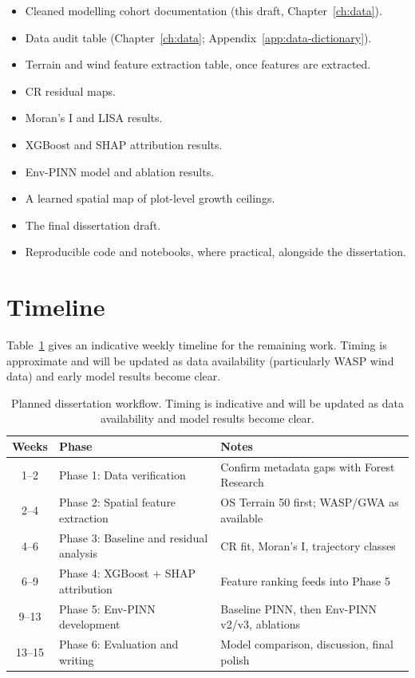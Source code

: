 \begin{itemize}
  \item Cleaned modelling cohort documentation (this draft, Chapter~\ref{ch:data}).
  \item Data audit table (Chapter~\ref{ch:data}; Appendix~\ref{app:data-dictionary}).
  \item Terrain and wind feature extraction table, once features are extracted.
  \item CR residual maps.
  \item Moran's I and LISA results.
  \item XGBoost and SHAP attribution results.
  \item Env-PINN model and ablation results.
  \item A learned spatial map of plot-level growth ceilings.
  \item The final dissertation draft.
  \item Reproducible code and notebooks, where practical, alongside the dissertation.
\end{itemize}

\section{Timeline}

Table~\ref{tab:timeline} gives an indicative weekly timeline for the remaining work. Timing is approximate and will be updated as data availability (particularly WASP wind data) and early model results become clear.

\begin{table}[h]
\centering
\begin{tabular}{cll}
\toprule
Weeks & Phase & Notes \\
\midrule
1--2 & Phase 1: Data verification & Confirm metadata gaps with Forest Research \\
2--4 & Phase 2: Spatial feature extraction & OS Terrain 50 first; WASP/GWA as available \\
4--6 & Phase 3: Baseline and residual analysis & CR fit, Moran's I, trajectory classes \\
6--9 & Phase 4: XGBoost + SHAP attribution & Feature ranking feeds into Phase 5 \\
9--13 & Phase 5: Env-PINN development & Baseline PINN, then Env-PINN v2/v3, ablations \\
13--15 & Phase 6: Evaluation and writing & Model comparison, discussion, final polish \\
\bottomrule
\end{tabular}
\caption{Planned dissertation workflow. Timing is indicative and will be updated as data availability and model results become clear.}
\label{tab:timeline}
\end{table}
